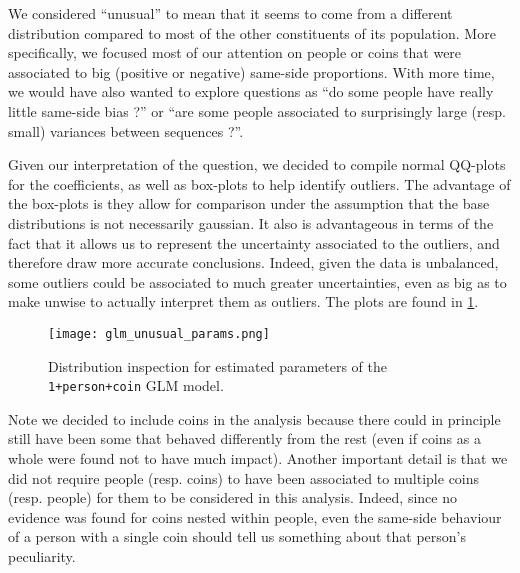 \documentclass[a4paper, 12pt,oneside]{article}
\begin{document}
			We considered ``unusual'' to mean that it seems to come from a different distribution compared to most of the other constituents of its population. More specifically, we focused most of our attention on people or coins that were associated to big (positive or negative) same-side proportions.  
			With more time, we would have also wanted to explore questions as  ``do some people have really little same-side bias ?'' or ``are some people associated to surprisingly large (resp. small) variances between sequences ?''.

			Given our interpretation of the question, we decided to compile normal QQ-plots for the coefficients, as well as box-plots to help identify outliers. The advantage of the box-plots is they allow for comparison under the assumption that the base distributions is not necessarily gaussian. 
			It also is advantageous in terms of the fact that it allows us to represent the uncertainty associated to the outliers, and therefore draw more accurate conclusions. Indeed, given the data is unbalanced, some outliers could be associated to much greater uncertainties, even as big as to make unwise to actually interpret them as outliers. 
			The plots are found in \ref{fig:unusual-params}. 
			\begin{figure}[h!]
				\centering
				\texttt{[image: glm\_unusual\_params.png]}
				\caption{Distribution inspection for estimated parameters of the \texttt{1+person+coin} GLM model.}
				\label{fig:unusual-params}
			\end{figure}

			Note we decided to include coins in the analysis because there could in principle still have been some that behaved differently from the rest (even if coins as a whole were found not to have much impact). 
			Another important detail is that we did not require people (resp. coins) to have been associated to multiple coins (resp. people) for them to be considered in this analysis. Indeed, since no evidence was found for coins nested within people, even the same-side behaviour of a person with a single coin should tell us something about that person's peculiarity.
\end{document}

